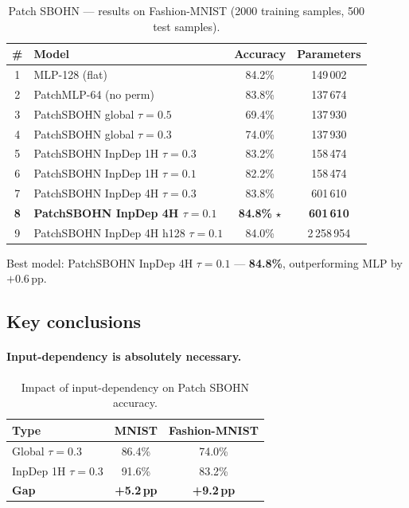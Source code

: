 \documentclass[11pt,a4paper]{report}
\begin{document}
\begin{table}[h]
\centering
\caption{Patch SBOHN --- results on Fashion-MNIST (2000 training samples, 500 test samples).}
\begin{tabular}{clcc}
\hline
\# & \textbf{Model} & \textbf{Accuracy} & \textbf{Parameters} \\
\hline
1 & MLP-128 (flat) & 84.2\% & 149\,002 \\
2 & PatchMLP-64 (no perm) & 83.8\% & 137\,674 \\
3 & PatchSBOHN global $\tau{=}0.5$ & 69.4\% & 137\,930 \\
4 & PatchSBOHN global $\tau{=}0.3$ & 74.0\% & 137\,930 \\
5 & PatchSBOHN InpDep 1H $\tau{=}0.3$ & 83.2\% & 158\,474 \\
6 & PatchSBOHN InpDep 1H $\tau{=}0.1$ & 82.2\% & 158\,474 \\
7 & PatchSBOHN InpDep 4H $\tau{=}0.3$ & 83.8\% & 601\,610 \\
\textbf{8} & \textbf{PatchSBOHN InpDep 4H $\tau{=}0.1$} & \textbf{84.8\%} $\star$ & \textbf{601\,610} \\
9 & PatchSBOHN InpDep 4H h128 $\tau{=}0.1$ & 84.0\% & 2\,258\,954 \\
\hline
\end{tabular}
\end{table}

Best model: PatchSBOHN InpDep 4H $\tau{=}0.1$ --- \textbf{84.8\%}, outperforming MLP by $+0.6$\,pp.

\subsection{Key conclusions}

\paragraph{Input-dependency is absolutely necessary.}

\begin{table}[h]
\centering
\caption{Impact of input-dependency on Patch SBOHN accuracy.}
\begin{tabular}{lcc}
\hline
\textbf{Type} & \textbf{MNIST} & \textbf{Fashion-MNIST} \\
\hline
Global $\tau{=}0.3$ & 86.4\% & 74.0\% \\
InpDep 1H $\tau{=}0.3$ & 91.6\% & 83.2\% \\
\textbf{Gap} & \textbf{+5.2\,pp} & \textbf{+9.2\,pp} \\
\hline
\end{tabular}
\end{table}
\end{document}
